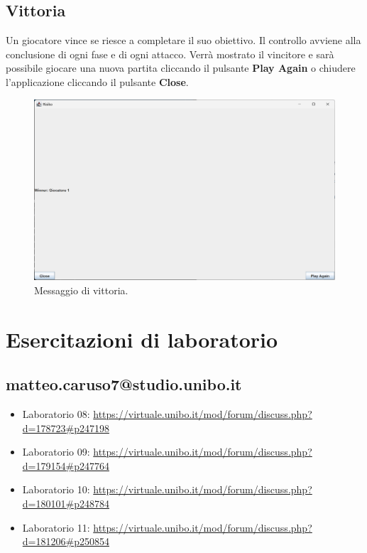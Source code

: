 \documentclass[a4paper,12pt]{report}
\begin{document}
\section{Vittoria}
Un giocatore vince se riesce a completare il suo obiettivo.
Il controllo avviene alla conclusione di ogni fase e di ogni attacco.
Verrà mostrato il vincitore e sarà possibile giocare una nuova partita cliccando il pulsante \textbf{Play Again} o chiudere l'applicazione cliccando il pulsante \textbf{Close}.
\begin{figure}[H]
	\centering
	\includegraphics[width=1\textwidth]{user_guide/14_victory.png}
	\caption{Messaggio di vittoria.}
\end{figure}

\chapter{Esercitazioni di laboratorio}

\section{matteo.caruso7@studio.unibo.it}

\begin{itemize}
	\item Laboratorio 08: \url{https://virtuale.unibo.it/mod/forum/discuss.php?d=178723#p247198}
	\item Laboratorio 09: \url{https://virtuale.unibo.it/mod/forum/discuss.php?d=179154#p247764}
	\item Laboratorio 10: \url{https://virtuale.unibo.it/mod/forum/discuss.php?d=180101#p248784}
	\item Laboratorio 11: \url{https://virtuale.unibo.it/mod/forum/discuss.php?d=181206#p250854}
\end{itemize}
\end{document}
